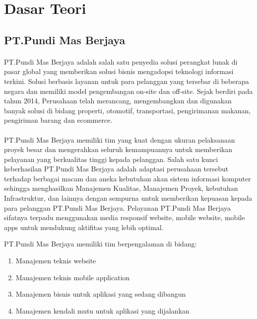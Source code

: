 \documentclass[./bab_2.tex]{subfiles}
\begin{document}
\section{Dasar Teori}
  \subsection{PT.Pundi Mas Berjaya}
    \paragraph*{} PT.Pundi Mas Berjaya adalah salah satu
    penyedia solusi perangkat lunak di pasar global yang
    memberikan solusi bisnis mengadopsi teknologi informasi
    terkini. Solusi berbasis layanan untuk para pelanggan
    yang tersebar di beberapa negara dan memiliki model
    pengembangan on-site dan off-site. Sejak berdiri pada
    tahun 2014, Perusahaan telah merancang, mengembangkan
    dan digunakan banyak solusi di bidang properti,
    otomotif, transportasi, pengirimanan makanan, pengiriman
    barang dan ecommerce.

    \paragraph*{} PT.Pundi Mas Berjaya memiliki tim yang
    kuat dengan ukuran pelaksanaan proyek besar dan
    mengerahkan seluruh kemampuannya untuk memberikan
    pelayanan yang berkualitas tinggi kepada pelanggan.
    Salah satu kunci keberhasilan PT.Pundi Mas Berjaya
    adalah adaptasi perusahaan tersebut
    terhadap berbagai macam dan aneka kebutuhan akan sistem
    informasi komputer sehingga menghasilkan Manajemen
    Kualitas, Manajemen Proyek, kebutuhan Infrastruktur, dan
    lainnya dengan sempurna untuk memberikan kepuasan kepada
    para pelanggan PT.Pundi Mas Berjaya. Pelayanan PT.Pundi Mas Berjaya sifatnya terpadu
    menggunakan media responsif website, mobile website,
    mobile apps untuk mendukung aktifitas yang lebih
    optimal.

    PT.Pundi Mas Berjaya memiliki tim berpengalaman di
    bidang:
    \begin{enumerate}
      \item Manajemen teknis website
      \item Manajemen teknis mobile application
      \item Manajemen bisnis untuk aplikasi yang sedang dibangun
      \item Manajemen kendali mutu untuk aplikasi yang dijalankan
    \end{enumerate}
    
\end{document}
